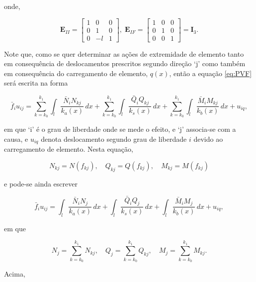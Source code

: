onde,

\begin{equation}
	\mathbf{E}_{II} =
	\begin{bmatrix}
		1 & 0  & 0 \\
		0 & 1  & 0 \\
		0 & -l & 1
	\end{bmatrix}
	, \;
	\mathbf{E}_{IF} =
	\begin{bmatrix}
		1 & 0 & 0 \\
		0 & 1 & 0 \\
		0 & 0 & 1
	\end{bmatrix}
	= \mathbf{I}_3.
\end{equation}

Note que, como se quer determinar as ações de extremidade de elemento tanto em consequência de deslocamentos prescritos segundo direção `j' como também em consequência do carregamento de elemento, $q(x)$, então a equação \ref{eq:PVF} será escrita na forma

\begin{equation}
	\bar{f}_i u_{ij}
	=
	\sum_{k=k_0}^{k_1} \int_l \dfrac{\bar{N}_i N_{kj}}{k_a(x)} \,dx
	+ \sum_{k=k_0}^{k_1} \int_l \dfrac{\bar{Q}_i Q_{kj}}{k_s(x)} \,dx
	+ \sum_{k=k_0}^{k_1} \int_l \dfrac{\bar{M}_i M_{kj}}{k_b(x)} \,dx
	+ u_{iq},
\end{equation}

em que `i' é o grau de liberdade onde se mede o efeito, e  `j' associa-se com a causa, e $u_{iq}$ denota deslocamento segundo grau de liberdade $i$ devido ao carregamento de elemento. Nesta equação,

\begin{equation}
	N_{kj} = N(f_{kj}),\quad Q_{kj} = Q(f_{kj}),\quad M_{kj} = M(f_{kj})
\end{equation}

e pode-se ainda escrever

\begin{equation}
	\bar{f}_i u_{ij}
	=
	\int_l \dfrac{\bar{N}_i  N_{j}}{k_a(x)} \,dx
	+ \int_l \dfrac{\bar{Q}_i Q_{j}}{k_s(x)} \,dx
	+ \int_l \dfrac{\bar{M}_i M_{j}}{k_b(x)} \,dx
	+ u_{iq},
\end{equation}

em que

\begin{equation}
	N_j =
	\sum_{k=k_0}^{k_1} N_{kj},\quad Q_j =
	\sum_{k=k_0}^{k_1} Q_{kj}, \quad M_j =
	\sum_{k=k_0}^{k_1} M_{kj}.
	\nonumber
\end{equation}

Acima,

